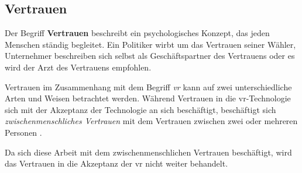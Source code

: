 \documentclass[a4paper,11pt]{article}%
\renewcommand{\\}{\vspace*{0.5\baselineskip} \newline}
\begin{document}
\newpage

\subsection{Vertrauen}
\label{Vertrauen}
Der Begriff \textbf{Vertrauen} beschreibt ein psychologisches Konzept, das jeden Menschen ständig begleitet.
Ein Politiker wirbt um das Vertrauen seiner Wähler, Unternehmer beschreiben sich selbst als \glqq{}Geschäftspartner des Vertrauens\grqq{} oder es wird der \glqq{}Arzt des Vertrauens\dq{} empfohlen.

Vertrauen im Zusammenhang mit dem Begriff \textit{\ac{vr}} kann auf zwei unterschiedliche Arten und Weisen betrachtet werden. 
Während Vertrauen in die \ac{vr}-Technologie sich mit der Akzeptanz der Technologie an sich beschäftigt, beschäftigt sich \textit{zwischenmenschliches Vertrauen} mit dem Vertrauen zwischen zwei oder mehreren Personen \citep{mcknight2011trust}.

Da sich diese Arbeit mit dem zwischenmenschlichen Vertrauen beschäftigt, wird das Vertrauen in die Akzeptanz der \ac{vr} nicht weiter behandelt.
\end{document}
